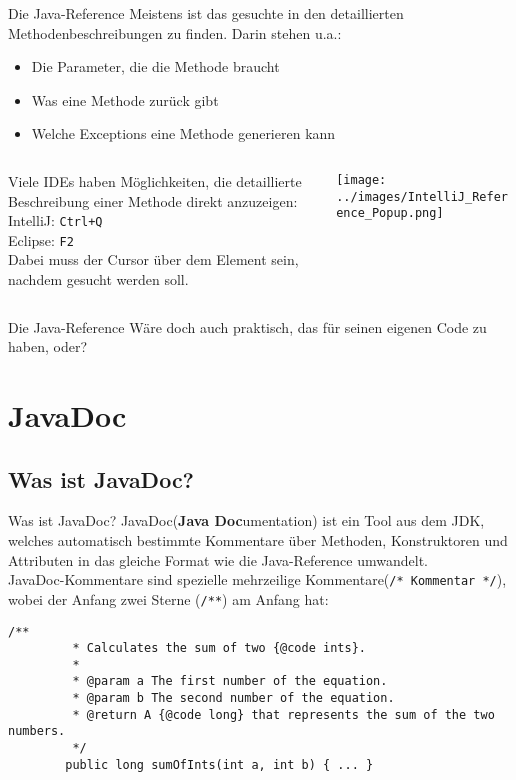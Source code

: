 \begin{frame}{Die Java-Reference}
    Meistens ist das gesuchte in den detaillierten Methodenbeschreibungen zu finden. Darin stehen u.a.:
    \begin{itemize}[<+->]
        \item Die Parameter, die die Methode braucht
        \item Was eine Methode zurück gibt
        \item Welche Exceptions eine Methode generieren kann
    \end{itemize}
    \medskip
    \onslide<+->
    \begin{columns}
        \begin{column}{0.5\textwidth}
            Viele IDEs haben Möglichkeiten, die detaillierte Beschreibung einer Methode direkt anzuzeigen:\\
            IntelliJ: \texttt{Ctrl+Q} \\
            Eclipse: \texttt{F2} \\
            \smallskip
            Dabei muss der Cursor über dem Element sein, nachdem gesucht werden soll.
        \end{column}
        \begin{column}{0.5\textwidth}
            \texttt{[image: ../images/IntelliJ\_Reference\_Popup.png]}
        \end{column}
    \end{columns}
\end{frame}

\begin{frame}{Die Java-Reference}
    \center
    \huge
    Wäre doch auch praktisch, das für seinen eigenen Code zu haben, oder?
\end{frame}

\section{JavaDoc}
\subsection{Was ist JavaDoc?}
\begin{frame}[fragile]{Was ist JavaDoc?}
    JavaDoc(\textbf{Java Doc}umentation) ist ein Tool aus dem JDK, welches automatisch bestimmte Kommentare über
    Methoden, Konstruktoren und Attributen in das gleiche Format wie die Java-Reference umwandelt.\\
    JavaDoc-Kommentare sind spezielle mehrzeilige Kommentare(\texttt{/* Kommentar */}), wobei der Anfang zwei Sterne (\texttt{/**}) am Anfang hat:
    \begin{lstlisting}[gobble=8]
        /**
         * Calculates the sum of two {@code ints}.
         *
         * @param a The first number of the equation.
         * @param b The second number of the equation.
         * @return A {@code long} that represents the sum of the two numbers.
         */
        public long sumOfInts(int a, int b) { ... }
    \end{lstlisting}
\end{frame}

